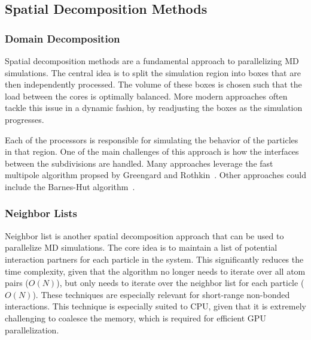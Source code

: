 \documentclass[conference]{IEEEtran}
\begin{document}
    \subsection{Spatial Decomposition Methods}

        \subsubsection{Domain Decomposition}
        Spatial decomposition methods are a fundamental approach to parallelizing MD simulations. The central idea is to 
        split the simulation region into boxes that are then independently processed. The volume of
        these boxes is chosen such that the load between the cores is optimally balanced. More modern approaches often
        tackle this issue in a dynamic fashion, by readjusting the boxes as the simulation progresses.


        Each of the processors is responsible for simulating the behavior of the particles in that region. One of the main
        challenges of this approach is how the interfaces between the subdivisions are handled. Many approaches
        leverage the fast multipole algorithm propsed by Greengard and Rothkin~\cite{greengard1987fast}. Other approaches
        could include the Barnes-Hut algorithm~\cite{barnes1986hierarchical}.

        \subsubsection{Neighbor Lists}
        Neighbor list is another spatial decomposition approach that can be used to parallelize MD simulations. The
        core idea is to maintain a list of potential interaction partners for each particle in the system. This
        significantly reduces the time complexity, given that the algorithm no longer needs to iterate over all
        atom pairs ($O(N)$), but only needs to iterate over the neighbor list for each particle ($O(N)$). These
        techniques are especially relevant for short-range non-bonded interactions. This technique is especially
        suited to CPU, given that it is extremely challenging to coalesce the memory, which is required for efficient
        GPU parallelization.~\cite{allen2017computer,verlet1967computer}
\end{document}
